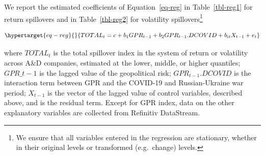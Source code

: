 \documentclass[
  letterpaper,
  DIV=11,
  numbers=noendperiod]{scrartcl}
\begin{document}
We report the estimated coefficients of Equation~\ref{eq-reg} in
Table~\ref{tbl-reg1} for return spillovers and in Table~\ref{tbl-reg2}
for volatility spillovers\footnote{We ensure that all variables entered
  in the regression are stationary, whether in their original levels or
  transformed (e.g.~change) levels.}

\begin{equation}\protect\hypertarget{eq-reg}{}{TOTAL_t=c+b_1GPR_{t-1}+b_2GPR_{t-1}.DCOVID+b_{it}X_{t-1}+e_t}\label{eq-reg}\end{equation}

where \(TOTAL_t\) is the total spillover index in the system of return
or volatility across A\&D companies, estimated at the lower, middle, or
higher quantiles; \(GPR\_{t-1}\) is the lagged value of the geopolitical
risk; \(GPR_{t-1}.DCOVID\) is the interaction term between GPR and the
COVID-19 and Russian-Ukraine war period; \(X_{t-1}\) is the vector of
the lagged value of control variables, described above, and is the
residual term. Except for GPR index, data on the other explanatory
variables are collected from Refinitiv DataStream.
\end{document}
